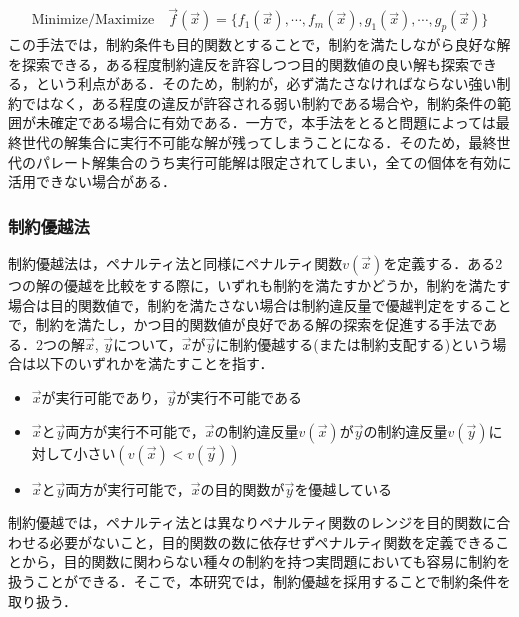 \begin{align}
    \mbox{Minimize/Maximize} \quad \vec{f}(\vec{x}) = \{f_1(\vec{x}), \cdots,f_m(\vec{x}), g_1(\vec{x}), \cdots, g_p(\vec{x})\}
\end{align}
この手法では，制約条件も目的関数とすることで，制約を満たしながら良好な解を探索できる，ある程度制約違反を許容しつつ目的関数値の良い解も探索できる，という利点がある．そのため，制約が，必ず満たさなければならない強い制約ではなく，ある程度の違反が許容される弱い制約である場合や，制約条件の範囲が未確定である場合に有効である．一方で，本手法をとると問題によっては最終世代の解集合に実行不可能な解が残ってしまうことになる．そのため，最終世代のパレート解集合のうち実行可能解は限定されてしまい，全ての個体を有効に活用できない場合がある．

\subsubsection{制約優越法\cite{Deb02}}
制約優越法は，ペナルティ法と同様にペナルティ関数$v(\vec{x})$を定義する．ある2つの解の優越を比較をする際に，いずれも制約を満たすかどうか，制約を満たす場合は目的関数値で，制約を満たさない場合は制約違反量で優越判定をすることで，制約を満たし，かつ目的関数値が良好である解の探索を促進する手法である．2つの解$\vec{x}$, $\vec{y}$について，$\vec{x}$が$\vec{y}$に制約優越する(または制約支配する)という場合は以下のいずれかを満たすことを指す．

\begin{itemize}
    \item $\vec{x}$が実行可能であり，$\vec{y}$が実行不可能である
    \item $\vec{x}$と$\vec{y}$両方が実行不可能で，$\vec{x}$の制約違反量$v(\vec{x})$が$\vec{y}$の制約違反量$v(\vec{y})$に対して小さい$(v(\vec{x})<v(\vec{y}))$
    \item $\vec{x}$と$\vec{y}$両方が実行可能で，$\vec{x}$の目的関数が$\vec{y}$を優越している
\end{itemize}

制約優越では，ペナルティ法とは異なりペナルティ関数のレンジを目的関数に合わせる必要がないこと，目的関数の数に依存せずペナルティ関数を定義できることから，目的関数に関わらない種々の制約を持つ実問題においても容易に制約を扱うことができる．そこで，本研究では，制約優越を採用することで制約条件を取り扱う．
